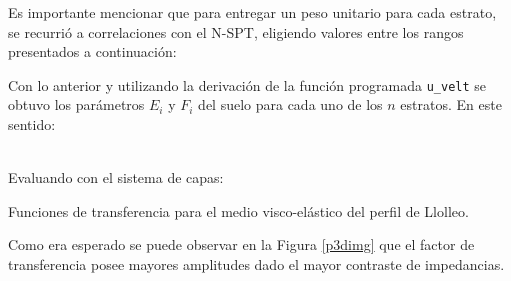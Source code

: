 Es importante mencionar que para entregar un peso unitario para cada estrato, se recurrió a correlaciones con el N-SPT, eligiendo valores entre los rangos presentados a continuación:


Con lo anterior y utilizando la derivación de la función programada \texttt{u\_velt} se obtuvo los parámetros $E_i$ y $F_i$ del suelo para cada uno de los $n$ estratos. En este sentido:

 \\

Evaluando con el sistema de capas:

\begin{images}[\label{p3dimg}]{Funciones de transferencia para el medio visco-elástico del perfil de Llolleo.}
\end{images}

Como era esperado se puede observar en la Figura \ref{p3dimg} que el factor de transferencia posee mayores amplitudes dado el mayor contraste de impedancias.
